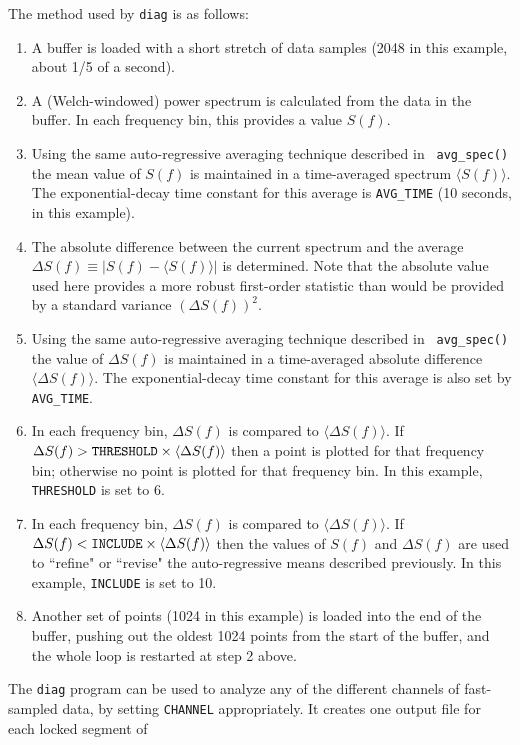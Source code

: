 The method used by {\tt diag} is as follows:
\begin{enumerate}
\item
A buffer is loaded with a short stretch of data samples (2048 in this
example, about 1/5 of a second).
\item
A (Welch-windowed) power spectrum is calculated from the data in 
the buffer.  In each frequency bin,
 this provides a value $S(f)$.
\item
Using the same auto-regressive averaging technique described in {\tt
avg\_spec()} the mean value of $S(f)$ is maintained in a time-averaged
spectrum $\langle S(f) \rangle$.  The exponential-decay time constant
for this average is {\tt AVG\_TIME} (10 seconds, in this example).
\item
The absolute difference between the current spectrum and the average
$\Delta S(f) \equiv |S(f) - \langle S(f) \rangle |$ is determined. Note
that the absolute value used here provides a more robust first-order
statistic than would be provided by a standard variance $(\Delta
S(f))^2$.
\item
Using the same auto-regressive averaging technique described in {\tt
avg\_spec()} the value of $\Delta S(f)$ is maintained in a
time-averaged absolute difference $\langle \Delta S(f) \rangle$.  The
exponential-decay time constant for this average is also set by {\tt
AVG\_TIME}.
\item
In each frequency bin, $\Delta S(f)$ is compared to $\langle \Delta
S(f) \rangle$.  If $\Delta S(f) > {\tt THRESHOLD} \times \langle \Delta
S(f) \rangle$ then a point is plotted for that frequency bin; otherwise
no point is plotted for that frequency bin.  In this example, {\tt
THRESHOLD} is set to 6.
\item
In each frequency bin, $\Delta S(f)$ is compared to $\langle \Delta
S(f) \rangle$.  If $\Delta S(f) < {\tt INCLUDE} \times \langle \Delta
S(f) \rangle$ then the values of $S(f)$ and $\Delta S(f)$ are used to
``refine" or ``revise" the auto-regressive means described previously.
In this example, {\tt INCLUDE} is set to 10.
\item
Another set of points (1024 in this example) is loaded into the
end of the buffer, pushing out the oldest 1024 points from the start
of the buffer, and the whole loop is restarted at step 2 above.
\end{enumerate}
The {\tt diag} program can be used to analyze any of the different
channels of fast-sampled data, by setting {\tt CHANNEL}
appropriately.  It creates one output file for each locked segment of
